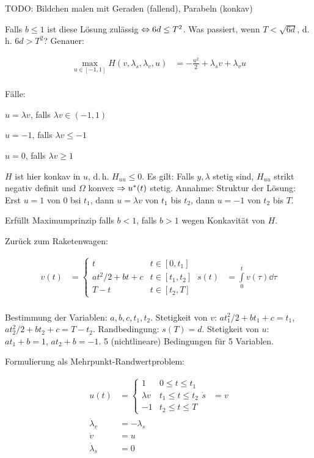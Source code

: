 TODO: Bildchen malen mit Geraden (fallend), Parabeln (konkav)

Falls $b \leq 1$ ist diese Lösung zulässig $\Leftrightarrow 6d \leq T^2$. Was passiert, wenn $T < \sqrt{6d}$, d.\,h. $6d > T^2$? Genauer: 

\begin{align*}
\max_{u\in [-1,1]} H(v, \lambda_s, \lambda_v, u) &= - \frac{u^2}2 + \lambda_s v + \lambda_v u \\
\end{align*}

Fälle:

\bitm
\item $u = \lambda v$, falls $\lambda v \in (-1,1)$
\item $u = -1$, falls $\lambda v \leq -1$
\item $u = 0$, falls $\lambda v \geq 1$
\eitm 

$H$ ist hier konkav in $u$, d.\,h. $H_{uu} \leq 0$. Es gilt: Falls $y, \lambda$ stetig sind, $H_{uu}$ strikt negativ definit und $\Omega$ konvex $\Rightarrow u^*(t)$ stetig. Annahme: Struktur der Lösung:
Erst $u=1$ von $0$ bsi $t_1$, dann $u = \lambda v$ von $t_1$ bis $t_2$, dann $u = -1$ von $t_2$ bis $T$.

Erfüllt Maximumprinzip falls $b < 1$, falls $b>1$ wegen Konkavität von $H$.

Zurück zum Raketenwagen:

\begin{align*}
v(t) &= \begin{cases} t & t \in [0, t_1] \\ a t^2/2 + bt + c & t \in [t_1, t_2] \\T -t & t \in [t_2, T] \end{cases} \
s(t) &= \int\limits_0^t v(\tau) \dd \tau \\
\end{align*}

Bestimmung der Variablen: $a,b,c,t_1, t_2$. Stetigkeit von $v$: $a t_1^2 /2 + b t_1 + c = t_1$, $a t_2^2/2 + b t_2 + c = T -t_2$. Randbedingung: $s(T) = d$. Stetigkeit von $u$: $a t_1 + b = 1$, $a t_2 +b = -1$. 5 (nichtlineare) Bedingungen für 5 Variablen.

Formulierung als Mehrpunkt-Randwertproblem:

\begin{align*}
u(t) &= \begin{cases} 1 & 0 \leq t \leq t_1 \\ \lambda v & t_1 \leq t \leq t_2 \\ -1 & t_2\leq t \leq T \end{cases}
\dot s &= v \\
\dot \lambda_v &= -\lambda_s \\
\dot v &= u \\
\dot \lambda_s &= 0 \\
\end{align*}

